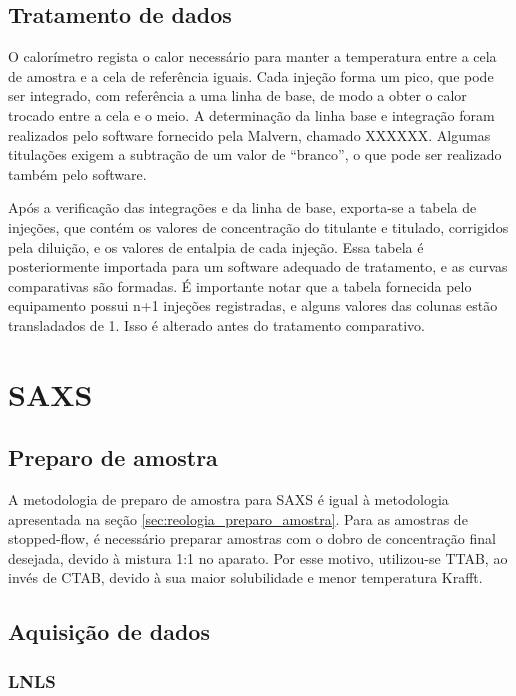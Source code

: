 				
		\section{Tratamento de dados}
		
		O calorímetro regista o calor necessário para manter a temperatura entre a cela de amostra e a cela de referência iguais. Cada injeção forma um pico, que pode ser integrado, com referência a uma linha de base, de modo a obter o calor trocado entre a cela e o meio. A determinação da linha base e integração foram realizados pelo software fornecido pela Malvern, chamado XXXXXX. Algumas titulações exigem a subtração de um valor de ``branco'', o que pode ser realizado também pelo software. %
		
		Após a verificação das integrações e da linha de base, exporta-se a tabela de injeções, que contém os valores de concentração do titulante e titulado, corrigidos pela diluição, e os valores de entalpia de cada injeção. Essa tabela é posteriormente importada para um software adequado de tratamento, e as curvas comparativas são formadas. É importante notar que a tabela fornecida pelo equipamento possui n+1 injeções registradas, e alguns valores das colunas estão transladados de 1. Isso é alterado antes do tratamento comparativo.
		
	\chapter{SAXS}
		\section{Preparo de amostra}
		
		A metodologia de preparo de amostra para SAXS é igual à metodologia apresentada na seção \ref{sec:reologia_preparo_amostra}. Para as amostras de stopped-flow, é necessário preparar amostras com o dobro de concentração final desejada, devido à mistura 1:1 no aparato. Por esse motivo, utilizou-se TTAB, ao invés de CTAB, devido à sua maior solubilidade e menor temperatura Krafft.
		
		\section{Aquisição de dados}
			\subsection{LNLS}
			
